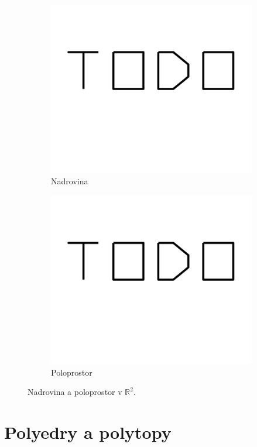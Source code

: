 \begin{figure}[h!]
    \centering
    \begin{subfigure}[b]{0.3\textwidth}
        \centering
        \includegraphics[width=\textwidth]{img/todo.png}   
        \caption{Nadrovina}
        \label{fig:hyperplane}
    \end{subfigure}

    \hfill

    \begin{subfigure}[b]{0.3\textwidth}
        \centering
        \includegraphics[width=\textwidth]{img/todo.png}   
        \caption{Poloprostor}
        \label{fig:halfspace}
    \end{subfigure}

    \caption{Nadrovina a poloprostor v $\mathbb{R}^2$.}
    \label{fig:hyperplane_halfspace}
\end{figure}

\section{Polyedry a polytopy}
